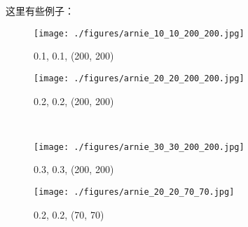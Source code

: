 \documentclass[UTF8]{ctexart}
\begin{document}
这里有些例子：
\begin{figure}[!h]
	\centering
	\begin{minipage}[t]{0.25\textwidth}
		\centering
		\texttt{[image: ./figures/arnie\_10\_10\_200\_200.jpg]}
		\caption{0.1, 0.1, (200, 200)}
	\end{minipage}
	\qquad	\qquad 
	\begin{minipage}[t]{0.25\textwidth}
		\centering
		\texttt{[image: ./figures/arnie\_20\_20\_200\_200.jpg]}
		\caption{0.2, 0.2, (200, 200)}
	\end{minipage}
\\
	\begin{minipage}[t]{0.3\textwidth}
		\centering
		\texttt{[image: ./figures/arnie\_30\_30\_200\_200.jpg]}
		\caption{0.3, 0.3, (200, 200)}
	\end{minipage}
	\begin{minipage}[t]{0.3\textwidth}
		\centering
		\texttt{[image: ./figures/arnie\_20\_20\_70\_70.jpg]}
		\caption{0.2, 0.2, (70, 70)}
	\end{minipage}
\end{figure}









\newpage


\end{document}
